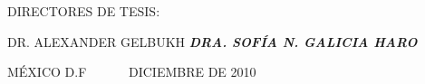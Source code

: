 \documentclass[letterpaper]{article}
\begin{document}
{\centering{}\sffamily
DIRECTORES DE TESIS:
\par}


\bigskip

{\centering{}\sffamily
DR. ALEXANDER GELBUKH \textbf{\textit{DRA. SOF\'IA N. GALICIA HARO}}
\par}


\bigskip


\bigskip


\bigskip

{\centering{}\sffamily
M\'EXICO D.F \ \ \ \ \ \ DICIEMBRE DE 2010
\par}


\bigskip


\bigskip


\bigskip

\section{}
\clearpage\section{}
\setcounter{tocdepth}{10}
\renewcommand\contentsname{\'Indice}
\tableofcontents
\section[]{}
\section{}
\section{}
\section{}
\section{}
\section{}
\section{}
\section{}
\end{document}

